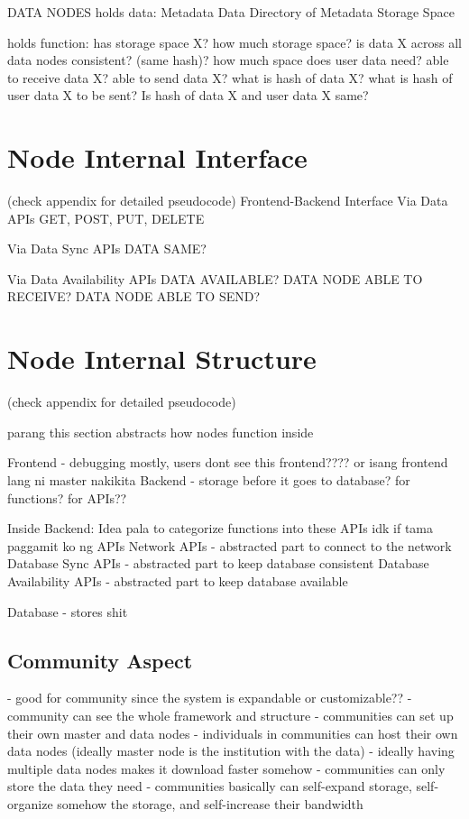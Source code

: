 \documentclass[acmsmall]{acmart}
\begin{document}
DATA NODES
holds data:
Metadata
Data
Directory of Metadata
Storage Space


holds function:
has storage space X?
how much storage space?
is data X across all data nodes consistent? (same hash)?
how much space does user data need?
able to receive data X?
able to send data X?
what is hash of data X?
what is hash of user data X to be sent?
Is hash of data X and user data X same?

\section{Node Internal Interface}
(check appendix for detailed pseudocode)
Frontend-Backend Interface
Via Data APIs
GET, POST, PUT, DELETE

Via Data Sync APIs
DATA SAME? 

Via Data Availability APIs
DATA AVAILABLE?
DATA NODE ABLE TO RECEIVE?
DATA NODE ABLE TO SEND?

\section{Node Internal Structure}
(check appendix for detailed pseudocode)

parang this section abstracts how nodes function inside

Frontend - debugging mostly, users dont see this frontend???? or isang frontend lang ni master nakikita
Backend - storage before it goes to database? for functions? for APIs??
 
Inside Backend: Idea pala to categorize functions into these APIs idk if tama paggamit ko ng APIs
Network APIs - abstracted part to connect to the network
Database Sync APIs - abstracted part to keep database consistent
Database Availability APIs - abstracted part to keep database available


Database - stores shit


\subsection{Community Aspect}
- good for community since the system is expandable or customizable??
- community can see the whole framework and structure
- communities can set up their own master and data nodes
- individuals in communities can host their own data nodes (ideally master node is the institution with the data)
- ideally having multiple data nodes makes it download faster somehow
- communities can only store the data they need
- communities basically can self-expand storage, self-organize somehow the storage, and self-increase their bandwidth 
\end{document}
